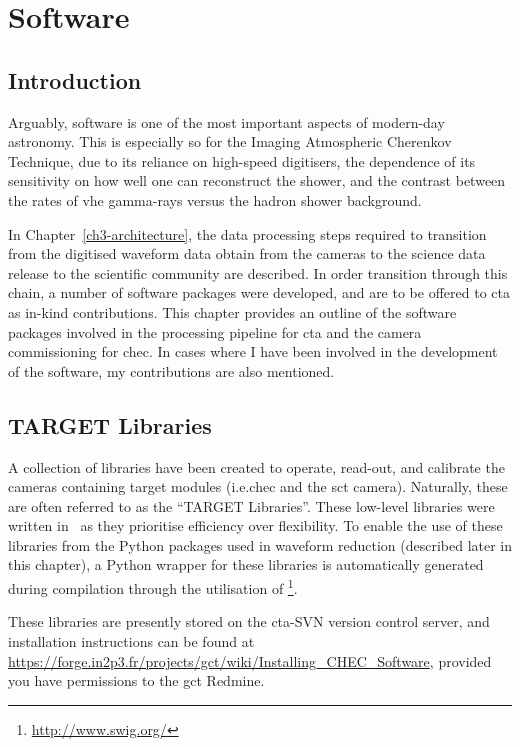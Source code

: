 \chapter{\label{ch4-software}Software} 

\minitoc

\section{Introduction}

Arguably, software is one of the most important aspects of modern-day astronomy. This is especially so for the Imaging Atmospheric Cherenkov Technique, due to its reliance on high-speed digitisers, the dependence of its sensitivity on how well one can reconstruct the shower, and the contrast between the rates of \gls{vhe} gamma-rays versus the hadron shower background.

In Chapter~\ref{ch3-architecture}, the data processing steps required to transition from the digitised waveform data obtain from the cameras to the science data release to the scientific community are described. In order transition through this chain, a number of software packages were developed, and are to be offered to \gls{cta} as in-kind contributions. This chapter provides an outline of the software packages involved in the processing pipeline for \gls{cta} and the camera commissioning for \gls{chec}. In cases where I have been involved in the development of the software, my contributions are also mentioned.

\section{TARGET Libraries}

A collection of libraries have been created to operate, read-out, and calibrate the cameras containing \gls{target} modules (i.e.\@ \gls{chec} and the \gls{sct} camera). Naturally, these are often referred to as the ``TARGET Libraries''. These low-level libraries were written in \cpp~as  they prioritise efficiency over flexibility. To enable the use of these libraries from the Python packages used in waveform reduction (described later in this chapter), a Python wrapper for these libraries is automatically generated during compilation through the utilisation of \footnote{\url{http://www.swig.org/}}.

These libraries are presently stored on the \gls{cta}-SVN version control server, and installation instructions can be found at \url{https://forge.in2p3.fr/projects/gct/wiki/Installing_CHEC_Software}, provided you have permissions to the \gls{gct} Redmine.

